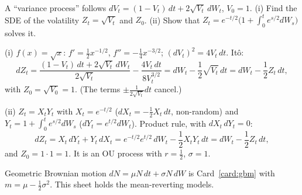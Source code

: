 \begin{example}
\label{ex:heston}
A ``variance process'' follows $dV_t=(1-V_t)\,dt+2\sqrt{V_t}\,dW_t$, $V_0=1$. (i) Find the SDE of the volatility $Z_t=\sqrt{V_t}$ and $Z_0$. (ii) Show that $Z_t=e^{-t/2}\big(1+\int_0^te^{s/2}dW_s\big)$ solves it.
\begin{steps}
  \item (i) $f(x)=\sqrt x$: $f'=\frac12x^{-1/2}$, $f''=-\frac14x^{-3/2}$; $(dV_t)^2=4V_t\,dt$. Itô:
  \[
    dZ_t=\frac{(1-V_t)\,dt+2\sqrt{V_t}\,dW_t}{2\sqrt{V_t}}-\frac{4V_t\,dt}{8V_t^{3/2}}=dW_t-\frac12\sqrt{V_t}\,dt=dW_t-\frac12Z_t\,dt,
  \]
  with $Z_0=\sqrt{V_0}=1$. (The terms $\pm\frac{1}{2\sqrt{V_t}}dt$ cancel.)
  \item (ii) $Z_t=X_tY_t$ with $X_t=e^{-t/2}$ ($dX_t=-\frac12X_t\,dt$, non-random) and $Y_t=1+\int_0^te^{s/2}dW_s$ ($dY_t=e^{t/2}dW_t$). Product rule, with $dX_t\,dY_t=0$:
  \[
    dZ_t=X_t\,dY_t+Y_t\,dX_t=e^{-t/2}e^{t/2}\,dW_t-\frac12X_tY_t\,dt=dW_t-\frac12Z_t\,dt,
  \]
  and $Z_0=1\cdot1=1$. It is an OU process with $r=\frac12$, $\sigma=1$.
\end{steps}
\end{example}


Geometric Brownian motion $dN=\mu N\,dt+\sigma N\,dW$ is Card~\ref{card:gbm} with $m=\mu-\frac12\sigma^2$. This sheet holds the mean-reverting models.

